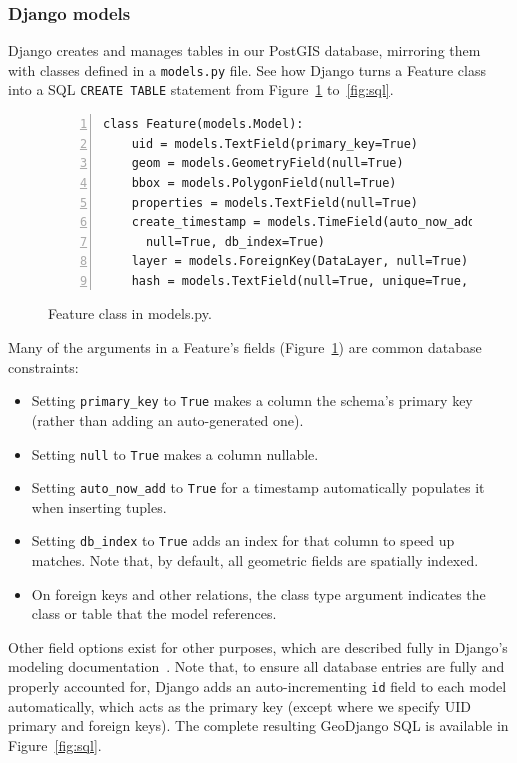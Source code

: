 \subsubsection{Django models}
Django creates and manages tables in our PostGIS database, mirroring them with classes defined in a \texttt{models.py} file. See how Django turns a Feature class into a SQL \texttt{CREATE TABLE} statement from Figure~\ref{fig:feature} to~\ref{fig:sql}.

\begin{figure}[ht]
\begin{Verbatim}[samepage=true,baselinestretch=1,numbers=left,xleftmargin=12mm]
class Feature(models.Model):
    uid = models.TextField(primary_key=True)
    geom = models.GeometryField(null=True)
    bbox = models.PolygonField(null=True)
    properties = models.TextField(null=True)
    create_timestamp = models.TimeField(auto_now_add=True,
      null=True, db_index=True)
    layer = models.ForeignKey(DataLayer, null=True)
    hash = models.TextField(null=True, unique=True, db_index=True)
\end{Verbatim}
\vspace{-18pt}
\caption{Feature class in models.py.}
\label{fig:feature}
\end{figure}


Many of the arguments in a Feature's fields (Figure~\ref{fig:feature}) are common database constraints:
\begin{itemize}
\item Setting \texttt{primary\_key} to \texttt{True} makes a column the schema's primary key (rather than adding an auto-generated one).
\item Setting \texttt{null} to \texttt{True} makes a column nullable.
\item Setting \texttt{auto\_now\_add} to \texttt{True} for a timestamp automatically populates it when inserting tuples.
\item Setting \texttt{db\_index} to \texttt{True} adds an index for that column to speed up matches. Note that, by default, all geometric fields are spatially indexed.
\item On foreign keys and other relations, the class type argument indicates the class or table that the model references.
\end{itemize}

Other field options exist for other purposes, which are described fully in Django's modeling documentation~\cite{Models}.  Note that, to ensure all database entries are fully and properly accounted for, Django adds an auto-incrementing \texttt{id} field to each model automatically, which acts as the primary key (except where we specify UID primary and foreign keys). The complete resulting GeoDjango SQL is available in Figure~\ref{fig:sql}.

